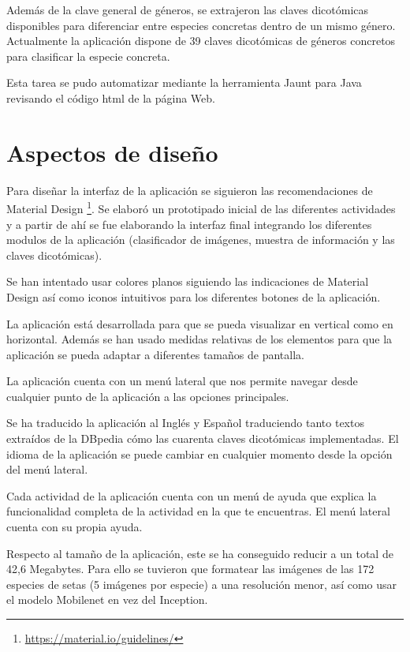 Además de la clave general de géneros, se extrajeron las claves dicotómicas disponibles para diferenciar entre especies concretas dentro de un mismo género. Actualmente la aplicación dispone de 39 claves dicotómicas de géneros concretos para clasificar la especie concreta.

Esta tarea se pudo automatizar mediante la herramienta Jaunt para Java revisando el código html de la página Web.

\section{Aspectos de diseño}

Para diseñar la interfaz de la aplicación se siguieron las recomendaciones de Material Design \footnote{\url{https://material.io/guidelines/}}. Se elaboró un prototipado inicial de las diferentes actividades y a partir de ahí se fue elaborando la interfaz final integrando los diferentes modulos de la aplicación (clasificador de imágenes, muestra de información y las claves dicotómicas).

Se han intentado usar colores planos siguiendo las indicaciones de Material Design así como iconos intuitivos para los diferentes botones de la aplicación.

La aplicación está desarrollada para que se pueda visualizar en vertical como en horizontal. Además se han usado medidas relativas de los elementos para que la aplicación se pueda adaptar a diferentes tamaños de pantalla.

La aplicación cuenta con un menú lateral que nos permite navegar desde cualquier punto de la aplicación a las opciones principales.

Se ha traducido la aplicación al Inglés y Español traduciendo tanto textos extraídos de la DBpedia cómo las cuarenta claves dicotómicas implementadas. El idioma de la aplicación se puede cambiar en cualquier momento desde la opción del menú lateral.

Cada actividad de la aplicación cuenta con un menú de ayuda que explica la funcionalidad completa de la actividad en la que te encuentras. El menú lateral cuenta con su propia ayuda.

Respecto al tamaño de la aplicación, este se ha conseguido reducir a un total de 42,6 Megabytes. Para ello se tuvieron que formatear las imágenes de las 172 especies de setas (5 imágenes por especie) a una resolución menor, así como usar el modelo Mobilenet en vez del Inception.









